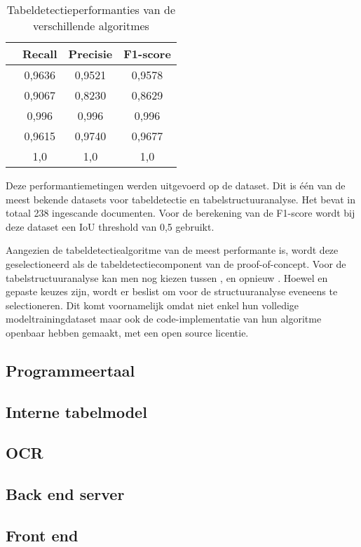 \begin{table}[H]
\centering
\begin{tabular}{@{}lccc@{}}
\toprule
                           & \Gls{Recall} & \Gls{Precisie} & \Gls{F1-score} \\ \midrule
\citeauthor{Tran2015}      & 0,9636       & 0,9521         & 0,9578         \\ \midrule
\citeauthor{Gilani2017}    & 0,9067       & 0,8230         & 0,8629         \\ \midrule
\citeauthor{Siddiqui2018}  & 0,996        & 0,996          & 0,996          \\ \midrule
\citeauthor{Schreiber2017} & 0,9615       & 0,9740         & 0,9677         \\ \midrule
\citeauthor{Prasad2020}    & 1,0          & 1,0            & 1,0            \\ \bottomrule
\end{tabular}
\caption{Tabeldetectieperformanties van de verschillende algoritmes}
\label{tab:tabel-detectie-performanties}
\end{table}

Deze performantiemetingen werden uitgevoerd op de  dataset. Dit is één van de meest bekende datasets voor tabeldetectie en tabelstructuuranalyse. Het bevat in totaal 238 ingescande documenten. Voor de berekening van de \Gls{F1-score} wordt bij deze dataset een \Gls{IoU} threshold van 0,5 gebruikt.

Aangezien de tabeldetectiealgoritme van \textcite{Prasad2020} de meest performante is, wordt deze geselectioneerd als de tabeldetectiecomponent van de proof-of-concept. Voor de tabelstructuuranalyse kan men nog kiezen tussen \autocite{Qasim2019}, \autocite{Schreiber2017} en opnieuw \autocite{Prasad2020}. Hoewel \autocite{Qasim2019} en \autocite{Schreiber2017} gepaste keuzes zijn, wordt er beslist om voor de structuuranalyse eveneens \autocite{Prasad2020} te selectioneren. Dit komt voornamelijk omdat \textcite{Prasad2020} niet enkel hun volledige modeltrainingdataset maar ook de code-implementatie van hun algoritme openbaar hebben gemaakt, met een open source licentie.

\subsection{Programmeertaal}

\subsection{Interne tabelmodel}

\subsection{OCR}

\subsection{Back end server}

\subsection{Front end}

\label{sec:evaluatie-ysteem}

